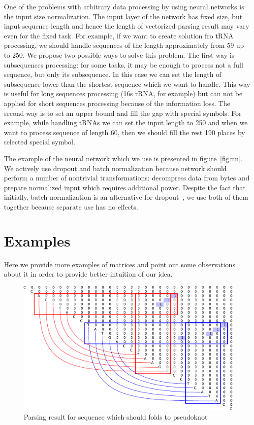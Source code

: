 \documentclass[a4paper,twoside]{article}
\begin{document}
One of the problems with arbitrary data processing by using neural networks is the input size normalization.
The input layer of the network has fixed size, but input sequence length and hence the length of vectorized parsing result may vary even for the fixed task.
For example, if we want to create solution fro tRNA processing, we should handle sequences of the length approximately from 59 up to 250.
We propose two possible ways to solve this problem.
The first way is subsequences processing: for some tasks, it may be enough to process not a full sequence, but only its subsequence.
In this case we can set the length of subsequence lower than the shortest sequence which we want to handle. 
This way is useful for long sequences processing (16s rRNA, for example) but can not be applied for short sequences processing because of the information loss.
The second way is to set an upper bound and fill the gap with special symbols.
For example, while handling tRNAs we can set the input length to 250 and when we want to process sequence of length 60, then we should fill the rest 190 places by selected special symbol.

The example of the neural network which we use is presented in figure~\ref{fig:nn}.
We actively use dropout and batch normalization because network should perform a number of nontrivial transformations: decompress data from bytes and prepare normalized input which requires additional power.
Despite the fact that initially, batch normalization is an alternative for dropout~\cite{DBLP:journals:corr:IoffeS15}, we use both of them together because separate use has no effects.

\section{Examples}
\label{sec:examples}

\noindent Here we provide more examples of matrices and point out some observations about it in order to provide better intuition of our idea.

\begin{figure}
\centering
\includegraphics[width=.45\textwidth]{figures/5.pdf}
\caption{Parsing result for sequence which should folds to pseudoknot}
\label{fig:pseudoknot}
\end{figure}
\end{document}
